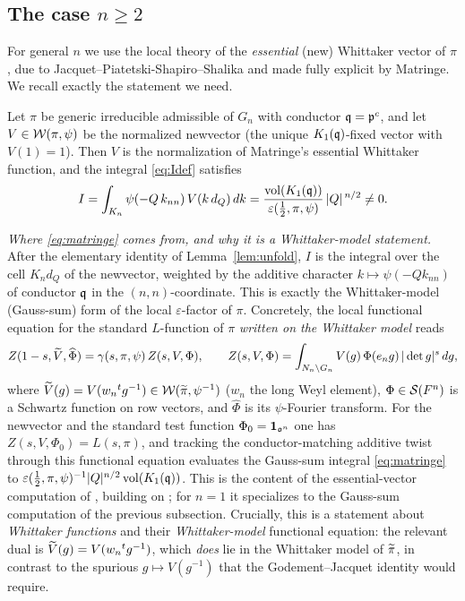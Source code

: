\subsection*{The case $n\ge2$}
For general $n$ we use the local theory of the \emph{essential} \textup{(}new\textup{)} Whittaker
vector of $\pi$, due to Jacquet--Piatetski-Shapiro--Shalika and made fully explicit by Matringe.
We recall exactly the statement we need.

\begin{qtwotheorem}\label{thm:newvector}
Let $\pi$ be generic irreducible admissible of $G_n$ with conductor $\mathfrak{q}=\mathfrak{p}^{c}$, and let
$V\in\mathcal{W}(\pi,\psi)$ be the normalized newvector \textup{(}the unique $K_1(\mathfrak{q})$-fixed
vector with $V(1)=1$\textup{)}. Then $V$ is the normalization of Matringe's essential Whittaker
function, and the integral \eqref{eq:Idef} satisfies
\begin{equation}\label{eq:matringe}
I=\int_{K_n}\psi(-Q\,k_{nn})\,V(k\,d_Q)\,dk
=\frac{\operatorname{vol}(K_1(\mathfrak{q}))}{\varepsilon(\tfrac12,\pi,\psi)}\,|Q|^{\,n/2}\neq0 .
\end{equation}
\end{qtwotheorem}

\noindent\emph{Where \eqref{eq:matringe} comes from, and why it is a Whittaker-model statement.}
After the elementary identity of Lemma~\ref{lem:unfold}, $I$ is the integral over the cell
$K_n d_Q$ of the newvector, weighted by the additive character $k\mapsto\psi(-Q k_{nn})$ of
conductor $\mathfrak{q}$ in the $(n,n)$-coordinate. This is exactly the Whittaker-model
\textup{(}Gauss-sum\textup{)} form of the local $\varepsilon$-factor of $\pi$. Concretely, the
local functional equation for the standard $L$-function of $\pi$ \emph{written on the Whittaker
model} reads
\[
Z(1-s,\widetilde{V},\widehat\Phi)=\gamma(s,\pi,\psi)\,Z(s,V,\Phi),\qquad
Z(s,V,\Phi)=\int_{N_n\backslash G_n}V(g)\,\Phi(e_n g)\,|\det g|^{s}\,dg,
\]
where $\widetilde{V}(g)=V(w_n{}^{t}g^{-1})\in\mathcal{W}(\widetilde{\pi},\psi^{-1})$ \textup{(}$w_n$ the
long Weyl element\textup{)}, $\Phi\in\mathcal S(F^{n})$ is a Schwartz function on row vectors,
and $\widehat\Phi$ is its $\psi$-Fourier transform. For the newvector and the standard test
function $\Phi_0=\mathbf 1_{\mathfrak{o}^{n}}$ one has $Z(s,V,\Phi_0)=L(s,\pi)$, and tracking the
conductor-matching additive twist through this functional equation evaluates the Gauss-sum
integral \eqref{eq:matringe} to $\varepsilon(\tfrac12,\pi,\psi)^{-1}|Q|^{n/2}\operatorname{vol}(K_1(\mathfrak{q}))$.
This is the content of the essential-vector computation of \cite[Thm.~1.1, \S3]{Matringe},
building on \cite[\S\S4--5]{JPSS81}; for $n=1$ it specializes to the Gauss-sum computation of the
previous subsection. Crucially, this is a statement about \emph{Whittaker functions} and their
\emph{Whittaker-model} functional equation: the relevant dual is
$\widetilde{V}(g)=V(w_n{}^{t}g^{-1})$, which \emph{does} lie in the Whittaker model of
$\widetilde{\pi}$, in contrast to the spurious $g\mapsto V(g^{-1})$ that the Godement--Jacquet
identity would require.

